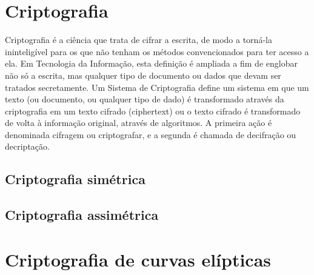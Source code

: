 \section{Criptografia} \label{sec:criptografia}
Criptografia é a ciência que trata de cifrar a escrita, de modo a torná-la ininteligível para os que não tenham os métodos convencionados para ter acesso a ela. Em Tecnologia da Informação, esta definição é ampliada a fim de englobar não só a escrita, mas qualquer tipo de documento ou dados que devam ser tratados secretamente. Um Sistema de Criptografia define um sistema em que um texto (ou documento, ou qualquer tipo de dado) é transformado através da criptografia em um texto cifrado (ciphertext) ou o texto cifrado é transformado de volta à informação original, através de algoritmos. A primeira ação é denominada cifragem ou criptografar, e a segunda é chamada de decifração ou decriptação. \cite{Portnoi:2005}

%
%
\subsection{Criptografia simétrica}

%
%
\subsection{Criptografia assimétrica}

%
%
\section{Criptografia de curvas elípticas}
